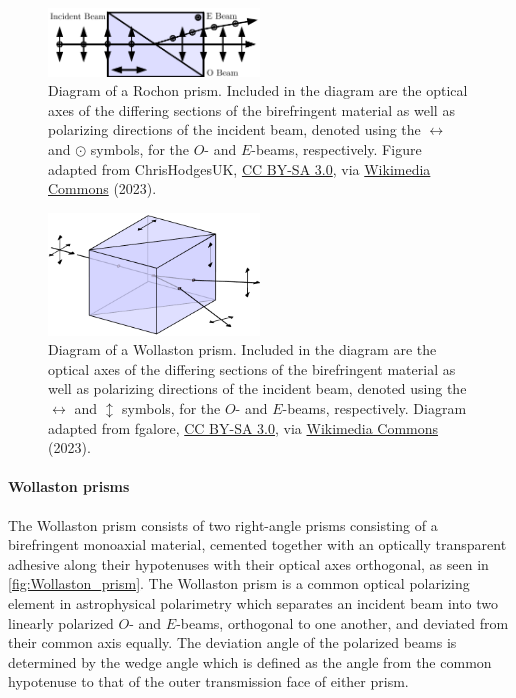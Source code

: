 \begin{figure}[t]
    \centering
    \includegraphics[width=0.5\textwidth]{figures/2_rochon.pdf}
    \caption{Diagram of a Rochon prism. Included in the diagram are the optical axes of the differing sections of the birefringent material as well as polarizing directions of the incident beam, denoted using the $\leftrightarrow$ and $\odot$ symbols, for the $O$- and $E$-beams, respectively. Figure adapted from ChrisHodgesUK, \protect\href{https://creativecommons.org/licenses/by-sa/3.0/}{CC BY-SA 3.0}, via \protect\href{https://commons.wikimedia.org/wiki/File:Rochon_Prism.svg}{Wikimedia Commons} (2023).}
    \label{fig:Rochon_prism}
\end{figure}

\begin{figure}[t]
    \centering
    \includegraphics[width=0.5\textwidth]{figures/2_wollaston.pdf}
    \caption{Diagram of a Wollaston prism. Included in the diagram are the optical axes of the differing sections of the birefringent material as well as polarizing directions of the incident beam, denoted using the $\leftrightarrow$ and $\updownarrow$ symbols, for the $O$- and $E$-beams, respectively. Diagram adapted from fgalore, \protect\href{https://creativecommons.org/licenses/by-sa/3.0/}{CC BY-SA 3.0}, via \protect\href{https://commons.wikimedia.org/wiki/File:Wollaston-prism.svg}{Wikimedia Commons} (2023).}
    \label{fig:Wollaston_prism}
\end{figure}

\paragraph{Wollaston prisms}
The Wollaston prism consists of two right-angle prisms consisting of a birefringent monoaxial material, cemented together with an optically transparent adhesive along their hypotenuses with their optical axes orthogonal, as seen in \autoref{fig:Wollaston_prism}. The Wollaston prism is a common optical polarizing element in astrophysical polarimetry which separates an incident beam into two linearly polarized $O$- and $E$-beams, orthogonal to one another, and deviated from their common axis equally. The deviation angle of the polarized beams is determined by the wedge angle which is defined as the angle from the common hypotenuse to that of the outer transmission face of either prism.

